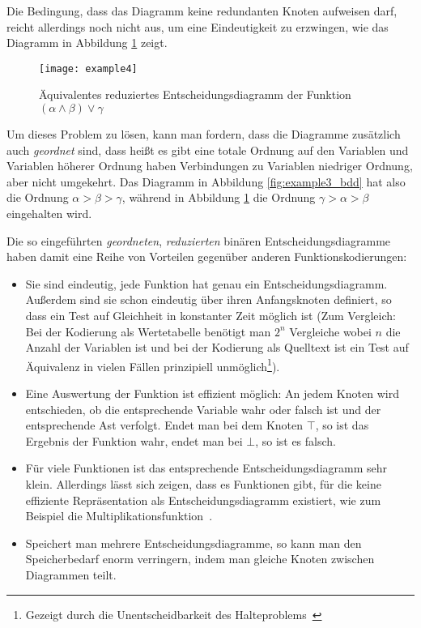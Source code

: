 Die Bedingung, dass das Diagramm keine redundanten Knoten aufweisen darf, reicht allerdings noch nicht aus, um eine Eindeutigkeit zu erzwingen, wie das Diagramm in Abbildung \ref{fig:example4_bdd} zeigt.
\begin{figure}[h]
  \centering
  \texttt{[image: example4]}
  \caption{Äquivalentes reduziertes Entscheidungsdiagramm der Funktion $(\alpha\land\beta)\lor \gamma$}
  \label{fig:example4_bdd}
\end{figure}

Um dieses Problem zu lösen, kann man fordern, dass die Diagramme zusätzlich auch \emph{geordnet} sind, dass heißt es gibt eine totale Ordnung auf den Variablen und Variablen höherer Ordnung haben Verbindungen zu Variablen niedriger Ordnung, aber nicht umgekehrt.
Das Diagramm in Abbildung \ref{fig:example3_bdd} hat also die Ordnung $\alpha > \beta > \gamma$, während in Abbildung \ref{fig:example4_bdd} die Ordnung $\gamma > \alpha > \beta$ eingehalten wird.

Die so eingeführten \emph{geordneten}, \emph{reduzierten} binären Entscheidungsdiagramme haben damit eine Reihe von Vorteilen gegenüber anderen Funktionskodierungen:
\begin{itemize}
\item Sie sind eindeutig, jede Funktion hat genau ein Entscheidungsdiagramm.
  Außerdem sind sie schon eindeutig über ihren Anfangsknoten definiert, so dass ein Test auf Gleichheit in konstanter Zeit möglich ist (Zum Vergleich: Bei der Kodierung als Wertetabelle benötigt man $2^n$ Vergleiche wobei $n$ die Anzahl der Variablen ist und bei der Kodierung als Quelltext ist ein Test auf Äquivalenz in vielen Fällen prinzipiell unmöglich\footnote{Gezeigt durch die Unentscheidbarkeit des Halteproblems~\cite{halteproblem}}).
\item Eine Auswertung der Funktion ist effizient möglich:
  An jedem Knoten wird entschieden, ob die entsprechende Variable wahr oder falsch ist und der entsprechende Ast verfolgt.
  Endet man bei dem Knoten $\top$, so ist das Ergebnis der Funktion wahr, endet man bei $\bot$, so ist es falsch.
\item Für viele Funktionen ist das entsprechende Entscheidungsdiagramm sehr klein.
  Allerdings lässt sich zeigen, dass es Funktionen gibt, für die keine effiziente Repräsentation als Entscheidungsdiagramm existiert, wie zum Beispiel die Multiplikationsfunktion~\cite{Bryant98onthe}.
\item Speichert man mehrere Entscheidungsdiagramme, so kann man den Speicherbedarf enorm verringern, indem man gleiche Knoten zwischen Diagrammen teilt.
\end{itemize}


